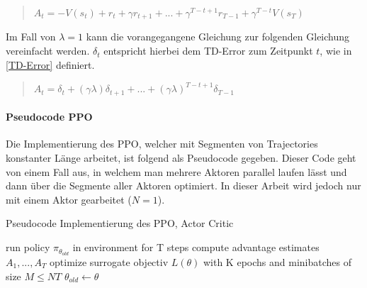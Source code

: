 \begin{quotation}
\centering
   \( A_t = -V(s_t) + r_t + \gamma r_{t+1} + ... + \gamma^{T-t+1} r_{T-1} + \gamma^{T-t} V(s_T) \)
\end{quotation}

Im Fall von $\lambda = 1$ kann die vorangegangene Gleichung zur folgenden Gleichung vereinfacht werden. $\delta_{t}$ entspricht hierbei dem TD-Error zum Zeitpunkt $t$, wie in \ref{TD-Error} definiert.

\begin{quotation}
\centering
   \( A_t = \delta_t + (\gamma \lambda)\delta_{t+1} + ... + (\gamma \lambda)^{T-t+1} \delta_{T-1} \)
\end{quotation}

\paragraph{Pseudocode PPO}
Die Implementierung des PPO, welcher mit Segmenten von Trajectories konstanter Länge arbeitet, ist folgend als Pseudocode gegeben. Dieser Code geht von einem Fall aus, in welchem man mehrere Aktoren parallel laufen lässt und dann über die Segmente aller Aktoren optimiert. In dieser Arbeit wird jedoch nur mit einem Aktor gearbeitet ($N=1$). 


\begin{algorithm}
\caption{Pseudocode Implementierung des PPO, Actor Critic }
\begin{algorithmic}

		\STATE  run policy $ \pi_{\theta_{old}} $ in environment for T steps 
		\STATE compute advantage estimates $ A_1, ..., A_T$
	\ENDWHILE
	\STATE optimize surrogate objectiv $ L(\theta) $ with K epochs and minibatches of size $ M \leq NT $
	\STATE $ \theta_{old} \leftarrow \theta $
\ENDWHILE

\end{algorithmic}
\end{algorithm}


